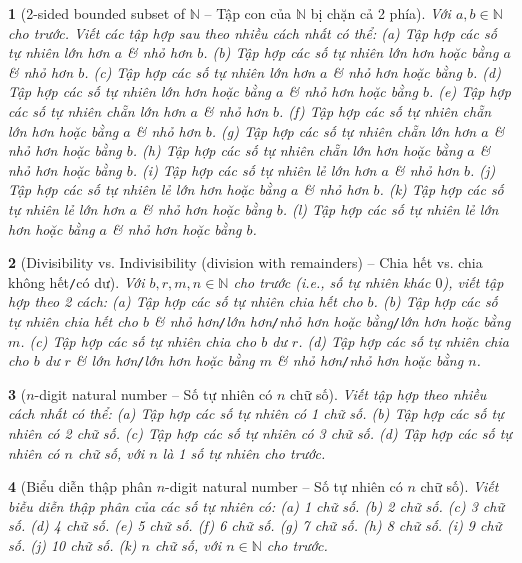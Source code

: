 \documentclass{article}
\newtheorem{baitoan}{}
\begin{document}
\begin{baitoan}[2-sided bounded subset of $\mathbb{N}$ -- Tập con của $\mathbb{N}$ bị chặn cả 2 phía]
	Với $a,b\in\mathbb{N}$ cho trước. Viết các tập hợp sau theo nhiều cách nhất có thể: (a) Tập hợp các số tự nhiên lớn hơn $a$ \& nhỏ hơn $b$. (b) Tập hợp các số tự nhiên lớn hơn hoặc bằng $a$ \& nhỏ hơn $b$. (c) Tập hợp các số tự nhiên lớn hơn $a$ \& nhỏ hơn hoặc bằng $b$. (d) Tập hợp các số tự nhiên lớn hơn hoặc bằng $a$ \& nhỏ hơn hoặc bằng $b$. (e) Tập hợp các số tự nhiên chẵn lớn hơn $a$ \& nhỏ hơn $b$. (f) Tập hợp các số tự nhiên chẵn lớn hơn hoặc bằng $a$ \& nhỏ hơn $b$. (g) Tập hợp các số tự nhiên chẵn lớn hơn $a$ \& nhỏ hơn hoặc bằng $b$. (h) Tập hợp các số tự nhiên chẵn lớn hơn hoặc bằng $a$ \& nhỏ hơn hoặc bằng $b$. (i) Tập hợp các số tự nhiên lẻ lớn hơn $a$ \& nhỏ hơn $b$. (j) Tập hợp các số tự nhiên lẻ lớn hơn hoặc bằng $a$ \& nhỏ hơn $b$. (k) Tập hợp các số tự nhiên lẻ lớn hơn $a$ \& nhỏ hơn hoặc bằng $b$. (l) Tập hợp các số tự nhiên lẻ lớn hơn hoặc bằng $a$ \& nhỏ hơn hoặc bằng $b$.
\end{baitoan}

\begin{baitoan}[Divisibility vs. Indivisibility (division with remainders) -- Chia hết vs. chia không hết{\tt/}có dư]
	Với $b,r,m,n\in\mathbb{N}$ cho trước (i.e., số tự nhiên khác $0$), viết tập hợp theo 2 cách: (a) Tập hợp các số tự nhiên chia hết cho $b$. (b) Tập hợp các số tự nhiên chia hết cho $b$ \& nhỏ hơn{\tt/}lớn hơn{\tt/}nhỏ hơn hoặc bằng{\tt/}lớn hơn hoặc bằng $m$. (c) Tập hợp các số tự nhiên chia cho $b$ dư $r$. (d) Tập hợp các số tự nhiên chia cho $b$ dư $r$ \& lớn hơn{\tt/}lớn hơn hoặc bằng $m$ \& nhỏ hơn{\tt/}nhỏ hơn hoặc bằng $n$.
\end{baitoan}

\begin{baitoan}[$n$-digit natural number -- Số tự nhiên có $n$ chữ số]
	Viết tập hợp theo nhiều cách nhất có thể: (a) Tập hợp các số tự nhiên có 1 chữ số. (b) Tập hợp các số tự nhiên có 2 chữ số. (c) Tập hợp các số tự nhiên có 3 chữ số. (d) Tập hợp các số tự nhiên có $n$ chữ số, với $n$ là 1 số tự nhiên cho trước.
\end{baitoan}

\begin{baitoan}[Biểu diễn thập phân $n$-digit natural number -- Số tự nhiên có $n$ chữ số]
	Viết biễu diễn thập phân của các số tự nhiên có: (a) 1 chữ số. (b) 2 chữ số. (c) 3 chữ số. (d) 4 chữ số. (e) 5 chữ số. (f) 6 chữ số. (g) 7 chữ số. (h) 8 chữ số. (i) 9 chữ số. (j) 10 chữ số. (k) $n$ chữ số, với $n\in\mathbb{N}$ cho trước.
\end{baitoan}
\end{document}
